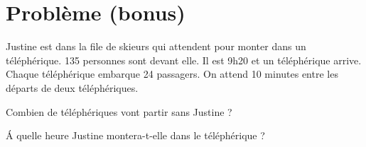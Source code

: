 \section{Problème (bonus)}

Justine est dans la file de skieurs qui attendent pour monter dans un téléphérique. 135 personnes sont devant elle. Il est 9h20 et un téléphérique arrive. Chaque téléphérique embarque 24 passagers. On attend 10 minutes entre les départs de deux téléphériques.

\begin{questions}
	\question Combien de téléphériques vont partir sans Justine ?
	
	\question \'A quelle heure Justine montera-t-elle dans le téléphérique ?
\end{questions}